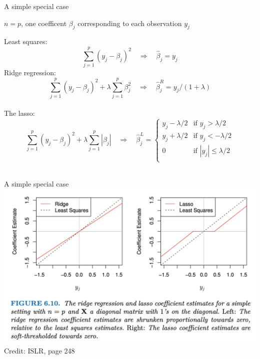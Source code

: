 \documentclass{beamer}
\begin{document}
  \begin{frame}{A simple special case}
    \begin{center}
      $n = p$, one coefficent $\beta_j$ corresponding to each observation $y_j$\\
    \end{center}
    Least squares:
    $$\sum_{j = 1}^p(y_j - \beta_j)^2 \quad \Rightarrow \quad \hat \beta_j = y_j$$
    Ridge regression:
    $$\sum_{j = 1}^p(y_j - \beta_j)^2 + \lambda \sum_{j = 1}^p \beta_j^2 \quad \Rightarrow \quad \hat \beta_j^R = y_j / (1 + \lambda)$$\\
    The lasso:
    $$\sum_{j = 1}^p(y_j - \beta_j)^2 + \lambda \sum_{j = 1}^p |\beta_j| \quad \Rightarrow \quad \hat \beta_j^L = \begin{cases}
      y_j - \lambda/2 & \mbox{if }y_j > \lambda / 2\\
      y_j + \lambda/2 & \mbox{if }y_j < -\lambda / 2\\
      0               & \mbox{if }|y_j| \le \lambda / 2\\
    \end{cases}$$\\
  \end{frame}

  \begin{frame}{A simple special case}
    \includegraphics[width = \textwidth]{images/simple_special_case.png}
    \vfill
    \hfill \footnotesize Credit: ISLR, page 248
  \end{frame}
\end{document}

